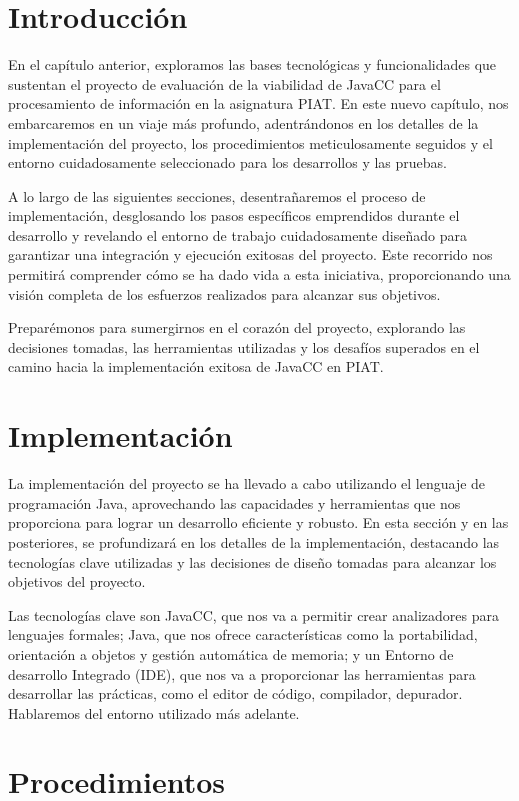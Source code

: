 \section{Introducción}
\noindent En el capítulo anterior, exploramos las bases tecnológicas y funcionalidades que sustentan el proyecto de evaluación de la viabilidad de JavaCC para el procesamiento de información en la asignatura PIAT. En este nuevo capítulo, nos embarcaremos en un viaje más profundo, adentrándonos en los detalles de la implementación del proyecto, los procedimientos meticulosamente seguidos y el entorno cuidadosamente seleccionado para los desarrollos y las pruebas.

A lo largo de las siguientes secciones, desentrañaremos el proceso de implementación, desglosando los pasos específicos emprendidos durante el desarrollo y revelando el entorno de trabajo cuidadosamente diseñado para garantizar una integración y ejecución exitosas del proyecto. Este recorrido nos permitirá comprender cómo se ha dado vida a esta iniciativa, proporcionando una visión completa de los esfuerzos realizados para alcanzar sus objetivos.

Preparémonos para sumergirnos en el corazón del proyecto, explorando las decisiones tomadas, las herramientas utilizadas y los desafíos superados en el camino hacia la implementación exitosa de JavaCC en PIAT.

\section{Implementación}
\noindent La implementación del proyecto se ha llevado a cabo utilizando el lenguaje de programación Java, aprovechando las capacidades y herramientas que nos proporciona para lograr un desarrollo eficiente y robusto. En esta sección y en las posteriores, se profundizará en los detalles de la implementación, destacando las tecnologías clave utilizadas y las decisiones de diseño tomadas para alcanzar los objetivos del proyecto. 

Las tecnologías clave son JavaCC, que nos va a permitir crear analizadores para lenguajes formales; Java, que nos ofrece características como la portabilidad, orientación a objetos y gestión automática de memoria; y un Entorno de desarrollo Integrado (IDE), que nos va a proporcionar las herramientas para desarrollar las prácticas, como el editor de código, compilador, depurador. Hablaremos del entorno utilizado más adelante.

\section{Procedimientos}


